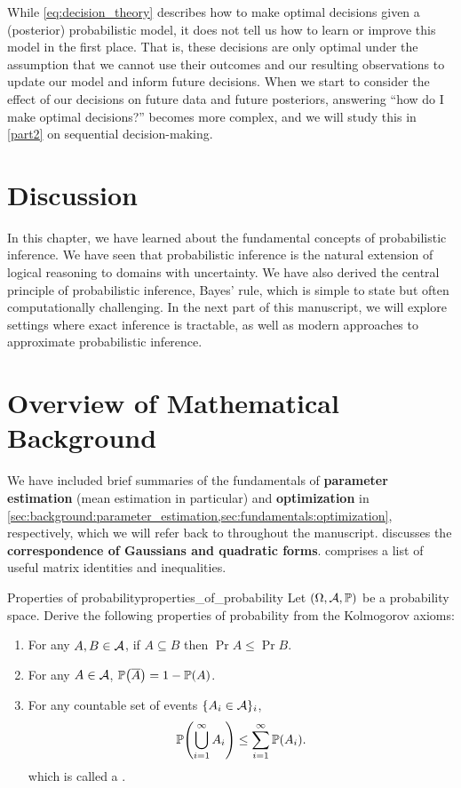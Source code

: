 While \cref{eq:decision_theory} describes how to make optimal decisions given a (posterior) probabilistic model, it does not tell us how to learn or improve this model in the first place.
That is, these decisions are only optimal under the assumption that we cannot use their outcomes and our resulting observations to update our model and inform future decisions.
When we start to consider the effect of our decisions on future data and future posteriors, answering ``how do I make optimal decisions?'' becomes more complex, and we will study this in \cref{part2} on sequential decision-making.

\section*{Discussion}

In this chapter, we have learned about the fundamental concepts of probabilistic inference.
We have seen that probabilistic inference is the natural extension of logical reasoning to domains with uncertainty.
We have also derived the central principle of probabilistic inference, Bayes' rule, which is simple to state but often computationally challenging.
In the next part of this manuscript, we will explore settings where exact inference is tractable, as well as modern approaches to approximate probabilistic inference.

\section*{Overview of Mathematical Background}

We have included brief summaries of the fundamentals of \textbf{parameter estimation} (mean estimation in particular) and \textbf{optimization} in \cref{sec:background:parameter_estimation,sec:fundamentals:optimization}, respectively, which we will refer back to throughout the manuscript.
 discusses the \textbf{correspondence of Gaussians and quadratic forms}.
 comprises a list of useful matrix identities and inequalities.

\excheading

\begin{nexercise}{Properties of probability}{properties_of_probability}
  Let $(\Omega, \mathcal{A}, \mathbb{P})$ be a probability space.
  Derive the following properties of probability from the Kolmogorov axioms:
  \begin{enumerate}
    \item For any $A, B \in \mathcal{A}$, if $A \subseteq B$ then $\Pr{A} \leq \Pr{B}$.
    \item For any $A \in \mathcal{A}$, $\Pr{\compl{A}} = 1 - \Pr{A}$.
    \item For any countable set of events $\{A_i \in \mathcal{A}\}_i$, \begin{align}
      \Pr{\bigcup_{i=1}^\infty \sA_i} \leq \sum_{i=1}^\infty \Pr{\sA_i}. \label{eq:union_bound}
    \end{align} which is called a .
  \end{enumerate}
\end{nexercise}

